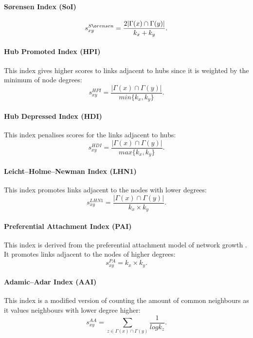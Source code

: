 \documentclass{llncs}
\begin{document}
\paragraph{S{\o}rensen Index (SoI) \cite{sorensen-index}}
%
\begin{equation}
s_{xy}^{S{\o}rensen} = \frac{2|\Gamma(x) \cap \Gamma(y)|}{k_x + k_y}.
\end{equation}
%
\paragraph{Hub Promoted Index (HPI) \cite{hub-index}}
%
This index gives higher scores to links adjacent to hubs since it is weighted by the minimum of node degrees:
\begin{equation}
s_{xy}^{HPI} = \frac{|\Gamma(x) \cap \Gamma(y)|}{min\{k_x, k_y\}}.
\end{equation}
%
\paragraph{Hub Depressed Index (HDI)}
%
This index penalises scores for the links adjacent to hubs:
\begin{equation}
s_{xy}^{HDI} = \frac{|\Gamma(x) \cap \Gamma(y)|}{max\{k_x, k_y\}}.
\end{equation}
%
\paragraph{Leicht–Holme–Newman Index (LHN1) \cite{lhn1-index}}
%
This index promotes links adjacent to the nodes with lower degrees:
\begin{equation}
s_{xy}^{LHN1} = \frac{|\Gamma(x) \cap \Gamma(y)|}{k_x \times k_y}.
\end{equation}
%
\paragraph{Preferential Attachment Index (PAI)}
%
This index is derived from the preferential attachment model of network growth \cite{netw-growth}. It promotes links adjacent to the nodes of higher degrees:
\begin{equation}
s_{xy}^{PA} = k_x \times k_y.
\end{equation}
%
\paragraph{Adamic–Adar Index (AAI) \cite{aa-index}}
%
This index is a modified version of counting the amount of common neighbours as it values neighbours with lower degree higher:
\begin{equation}
s_{xy}^{AA} = \sum_{z \in \Gamma(x) \cap \Gamma(y)} \frac{1}{log k_z}.
\label{aa-index-eq}
\end{equation}
%
\end{document}
